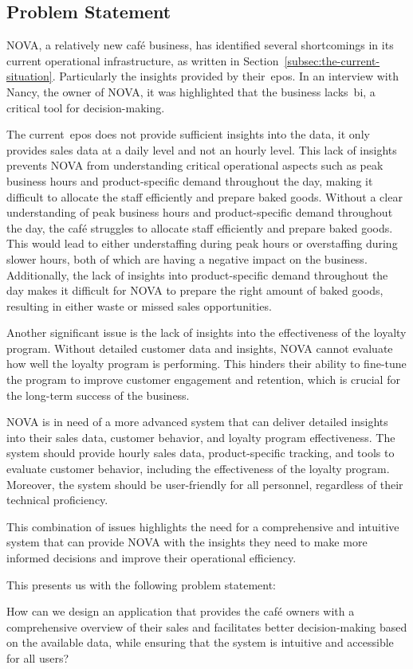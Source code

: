 \subsection{Problem Statement}\label{subsec:problem-statement}

NOVA, a relatively new café business, has identified several shortcomings in its current operational infrastructure,
as written in Section~\ref{subsec:the-current-situation}.
Particularly the insights provided by their~\acrfull{epos}.
In an interview with Nancy, the owner of NOVA, it was highlighted that the business lacks~\acrfull{bi}, a critical tool
for decision-making.

The current~\acrshort{epos} does not provide sufficient insights into the data, it only provides sales data at a daily
level and not an hourly level.
This lack of insights prevents NOVA from understanding critical operational aspects such as peak business hours and
product-specific demand throughout the day, making it difficult to allocate the staff efficiently and prepare baked
goods.
Without a clear understanding of peak business hours and product-specific demand throughout the day, the café struggles
to allocate staff efficiently and prepare baked goods.
This would lead to either understaffing during peak hours or overstaffing during slower hours, both of which are
having a negative impact on the business.
Additionally, the lack of insights into product-specific demand throughout the day makes it difficult for NOVA to
prepare the right amount of baked goods, resulting in either waste or missed sales opportunities.

Another significant issue is the lack of insights into the effectiveness of the loyalty program.
Without detailed customer data and insights, NOVA cannot evaluate how well the loyalty program is performing.
This hinders their ability to fine-tune the program to improve customer engagement and retention, which is crucial for
the long-term success of the business.

NOVA is in need of a more advanced system that can deliver detailed insights into their sales data, customer behavior,
and loyalty program effectiveness.
The system should provide hourly sales data, product-specific tracking, and tools to evaluate customer behavior,
including the effectiveness of the loyalty program.
Moreover, the system should be user-friendly for all personnel, regardless of their technical proficiency.

This combination of issues highlights the need for a comprehensive and intuitive system that can provide NOVA with the
insights they need to make more informed decisions and improve their operational efficiency.

This presents us with the following problem statement:
\begin{tcolorbox}[title=Problem statement]
    How can we design an application that provides the café owners with a comprehensive overview of their sales and
    facilitates better decision-making based on the available data, while ensuring that the system is intuitive and
    accessible for all users?
\end{tcolorbox}
